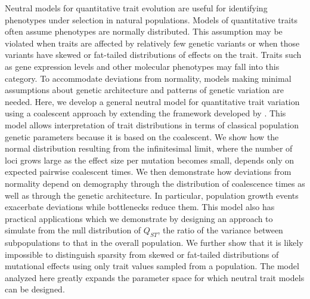 Neutral models for quantitative trait evolution are useful for identifying
phenotypes under selection in natural populations. Models of quantitative traits
often assume phenotypes are normally distributed. This assumption may be
violated when traits are affected by relatively few genetic variants or when
those variants have skewed or fat-tailed distributions of effects on the trait.
Traits such as gene expression levels and other molecular phenotypes may fall
into this category. To accommodate deviations from normality, models making
minimal assumptions about genetic architecture and patterns of genetic variation
are needed. Here, we develop a general neutral model for quantitative trait
variation using a coalescent approach by extending the framework developed
by \citet{Schraiber2015}. This model allows interpretation of trait
distributions in terms of classical population genetic parameters because it is
based on the coalescent. We show how the normal distribution resulting from the
infinitesimal limit, where the number of loci grows large as the effect size per
mutation becomes small, depends only on expected pairwise coalescent times. We
then demonstrate how deviations from normality depend on demography through the
distribution of coalescence times as well as through the genetic architecture.
In particular, population growth events exacerbate deviations while bottlenecks
reduce them. This model also has practical applications which we demonstrate by
designing an approach to simulate from the null distribution of $Q_{ST}$, the
ratio of the variance between subpopulations to that in the overall population.
We further show that it is likely impossible to distinguish sparsity from skewed
or fat-tailed distributions of mutational effects using only trait values
sampled from a population. The model analyzed here greatly expands the parameter
space for which neutral trait models can be designed.

